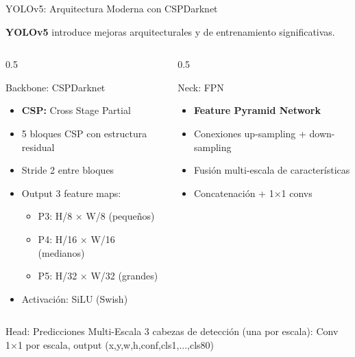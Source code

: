 \documentclass[aspectratio=169, 10pt]{beamer}
\begin{document}
\begin{frame}[shrink]{YOLOv5: Arquitectura Moderna con CSPDarknet}

	\textbf{YOLOv5} introduce mejoras arquitecturales y de entrenamiento significativas.

	\vspace{0.2cm}

	\begin{columns}[T]
		\begin{column}{0.5\textwidth}
			\begin{block}{Backbone: CSPDarknet}
				\small
				\begin{itemize}
					\item \textbf{CSP:} Cross Stage Partial
					\item 5 bloques CSP con estructura residual
					\item Stride 2 entre bloques
					\item Output 3 feature maps:
					\begin{itemize}
						\item P3: H/8 × W/8 (pequeños)
						\item P4: H/16 × W/16 (medianos)
						\item P5: H/32 × W/32 (grandes)
					\end{itemize}
					\item Activaci\'on: SiLU (Swish)
				\end{itemize}
			\end{block}
		\end{column}

		\begin{column}{0.5\textwidth}
			\begin{block}{Neck: FPN}
				\small
				\begin{itemize}
					\item \textbf{Feature Pyramid Network}
					\item Conexiones up-sampling + down-sampling
					\item Fusi\'on multi-escala de caracter\'isticas
					\item Concatenaci\'on + 1×1 convs
				\end{itemize}
			\end{block}
		\end{column}
	\end{columns}

	\vspace{0.2cm}

	\begin{block}{Head: Predicciones Multi-Escala}
		\small
		3 cabezas de detecci\'on (una por escala): Conv 1×1 por escala, output (x,y,w,h,conf,cls1,...,cls80)
	\end{block}

\end{frame}
\end{document}
